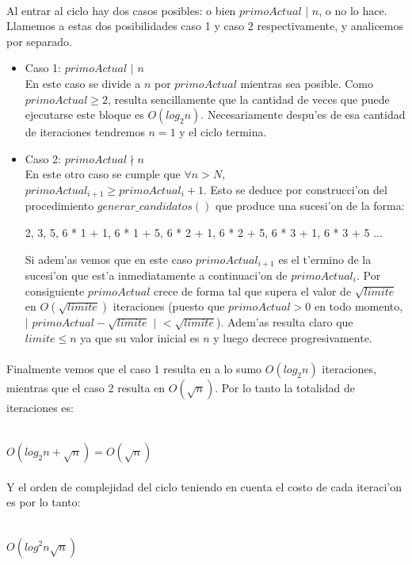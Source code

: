 \paragraph{}
Al entrar al ciclo hay dos casos posibles: o bien $primoActual$ $|$ $n$, o no lo hace. Llamemos a estas dos
posibilidades caso 1 y caso 2 respectivamente, y analicemos por separado.
\begin{itemize}
\item Caso 1: $primoActual$ $|$ $n$ \\
En este caso se divide a $n$ por $primoActual$ mientras sea posible. Como $primoActual \geq 2$, resulta
sencillamente que la cantidad de veces que puede ejecutarse este bloque es $O(log_2 n)$. Necesariamente
despu'es de esa cantidad de iteraciones tendremos $n = 1$ y el ciclo termina.
\item Caso 2: $primoActual \nmid n$\\
En este otro caso se cumple que $\forall n > N$, $primoActual_{i+1} \geq primoActual_i + 1$. Esto se deduce
por construcci'on del procedimiento $generar\_candidatos()$ que produce una sucesi'on de la forma: \\

\centerline{2, 3, 5, 6 * 1 + 1, 6 * 1 + 5, 6 * 2 + 1, 6 * 2 + 5, 6 * 3 + 1, 6 * 3 + 5 ...} 

Si adem'as vemos que en este caso $primoActual_{i+1}$ es el t'ermino de la sucesi'on que est'a 
inmediatamente a continuaci'on de $primoActual_i$. Por consiguiente $primoActual$ crece
de forma tal que supera el valor de $\sqrt{limite}$ en $O(\sqrt{limite})$ iteraciones (puesto
que $primoActual > 0$ en todo momento, $|$ $primoActual - \sqrt{limite}$ $|$ $< \sqrt{limite}$).
Adem'as resulta claro que $limite \leq n$ ya que su valor inicial es $n$ y luego decrece
progresivamente.
\end{itemize}

\paragraph{}
Finalmente vemos que el caso 1 resulta en a lo sumo $O(log_2 n)$ iteraciones, mientras que
el caso 2 resulta en $O(\sqrt{n})$. Por lo tanto la totalidad de iteraciones es:\\
\\
\centerline{$O(log_2 n + \sqrt{n}) = O(\sqrt{n})$}
\paragraph{}
Y el orden de complejidad del ciclo teniendo en cuenta el costo de cada iteraci'on es por lo tanto:\\
\\
\centerline{$O(log^2 n \sqrt{n})$}
